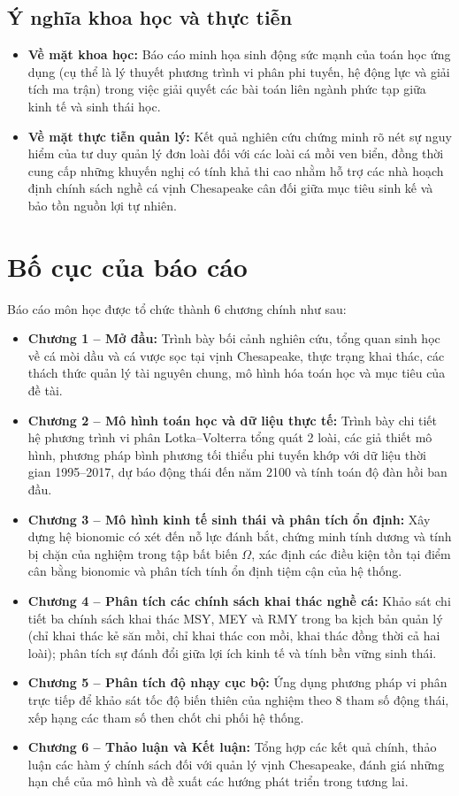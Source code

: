 \subsection{Ý nghĩa khoa học và thực tiễn}
\begin{itemize}
    \item \textbf{Về mặt khoa học:} Báo cáo minh họa sinh động sức mạnh của toán học ứng dụng (cụ thể là lý thuyết phương trình vi phân phi tuyến, hệ động lực và giải tích ma trận) trong việc giải quyết các bài toán liên ngành phức tạp giữa kinh tế và sinh thái học.
    \item \textbf{Về mặt thực tiễn quản lý:} Kết quả nghiên cứu chứng minh rõ nét sự nguy hiểm của tư duy quản lý đơn loài đối với các loài cá mồi ven biển, đồng thời cung cấp những khuyến nghị có tính khả thi cao nhằm hỗ trợ các nhà hoạch định chính sách nghề cá vịnh Chesapeake cân đối giữa mục tiêu sinh kế và bảo tồn nguồn lợi tự nhiên.
\end{itemize}

\section{Bố cục của báo cáo}
\label{sec:intro_outline}

Báo cáo môn học được tổ chức thành 6 chương chính như sau:
\begin{itemize}
    \item \textbf{Chương 1 -- Mở đầu:} Trình bày bối cảnh nghiên cứu, tổng quan sinh học về cá mòi dầu và cá vược sọc tại vịnh Chesapeake, thực trạng khai thác, các thách thức quản lý tài nguyên chung, mô hình hóa toán học và mục tiêu của đề tài.
    \item \textbf{Chương 2 -- Mô hình toán học và dữ liệu thực tế:} Trình bày chi tiết hệ phương trình vi phân Lotka--Volterra tổng quát 2 loài, các giả thiết mô hình, phương pháp bình phương tối thiểu phi tuyến khớp với dữ liệu thời gian 1995--2017, dự báo động thái đến năm 2100 và tính toán độ đàn hồi ban đầu.
    \item \textbf{Chương 3 -- Mô hình kinh tế sinh thái và phân tích ổn định:} Xây dựng hệ bionomic có xét đến nỗ lực đánh bắt, chứng minh tính dương và tính bị chặn của nghiệm trong tập bất biến $\Omega$, xác định các điều kiện tồn tại điểm cân bằng bionomic và phân tích tính ổn định tiệm cận của hệ thống.
    \item \textbf{Chương 4 -- Phân tích các chính sách khai thác nghề cá:} Khảo sát chi tiết ba chính sách khai thác MSY, MEY và RMY trong ba kịch bản quản lý (chỉ khai thác kẻ săn mồi, chỉ khai thác con mồi, khai thác đồng thời cả hai loài); phân tích sự đánh đổi giữa lợi ích kinh tế và tính bền vững sinh thái.
    \item \textbf{Chương 5 -- Phân tích độ nhạy cục bộ:} Ứng dụng phương pháp vi phân trực tiếp để khảo sát tốc độ biến thiên của nghiệm theo 8 tham số động thái, xếp hạng các tham số then chốt chi phối hệ thống.
    \item \textbf{Chương 6 -- Thảo luận và Kết luận:} Tổng hợp các kết quả chính, thảo luận các hàm ý chính sách đối với quản lý vịnh Chesapeake, đánh giá những hạn chế của mô hình và đề xuất các hướng phát triển trong tương lai.
\end{itemize}

